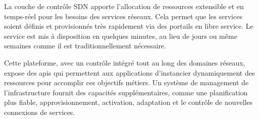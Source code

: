

La couche de contrôle SDN apporte l'allocation de ressources extensible et en temps-réel pour les besoins des services réseaux. Cela permet que les services soient définis et provisionnés très rapidement via des portails en libre service. Le service est mis à disposition en quelques minutes, au lieu de jours ou même semaines comme il est traditionnellement nécessaire.

Cette plateforme, avec un contrôle intégré tout au long des domaines réseaux, expose des \glspl{api} qui permettent aux applications d'instancier dynamiquement des ressources pour accomplir ces objectifs métiers. Un  système de management de l'infrastructure fournit des capacités supplémentaires, comme une planification plus fiable, approvisionnement, activation, adaptation et le contrôle de nouvelles connexions de services.

